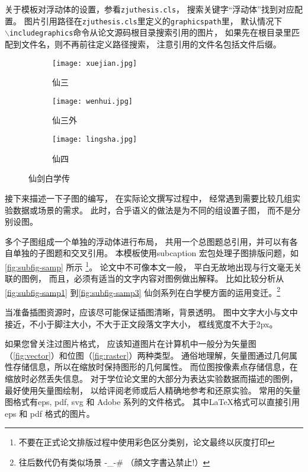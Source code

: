 关于模板对浮动体的设置，参看\texttt{zjuthesis.cls}，
搜索关键字“浮动体”找到对应配置。
图片引用路径在\texttt{zjuthesis.cls}里定义的\texttt{graphicspath}里，
默认情况下\\\texttt{$\backslash$includegraphics}命令从论文源码根目录搜索引用的图片，
如果先在根目录里匹配到文件名，则不再前往定义路径搜索，
注意引用的文件名包括文件后缀。

\begin{figure}[htbp]
	\centering
	\begin{subfigure}[b]{.45\textwidth}  %
		\centering
		\texttt{[image: xuejian.jpg]}
		\caption{仙三}\label{fig:subfig-samp1}
	\end{subfigure}
	\begin{subfigure}[b]{.45\textwidth}
		\centering
		\texttt{[image: wenhui.jpg]}
		\caption{仙三外}\label{fig:subfig-samp2}
	\end{subfigure}
	\begin{subfigure}[b]{.45\textwidth}
		\centering
		\texttt{[image: lingsha.jpg]}
		\caption{仙四}\label{fig:subfig-samp3}
	\end{subfigure}
	\caption{仙剑白学传}\label{fig:subfig-samp}
\end{figure}

接下来描述一下子图的编写，
在实际论文撰写过程中，
经常遇到需要比较几组实验数据或场景的需求。
此时，合乎语义的做法是为不同的组设置子图，
而不是分别设图。

多个子图组成一个单独的浮动体进行布局，
共用一个总图题总引用，并可以有各自单独的子图题和交叉引用。
本模板使用subcaption 宏包处理子图排版问题，如\autoref{fig:subfig-samp} 所示
\footnote{不要在正式论文排版过程中使用彩色区分类别，论文最终以灰度打印}。
论文中不可像本文一般，
平白无故地出现与行文毫无关联的图例，
而且，必须有适当的文字内容对图例做出解释。
比如比较分析从\autoref{fig:subfig-samp1} 到\autoref{fig:subfig-samp3}
仙剑系列在白学梗方面的运用变迁。\footnote{往后数代仍有类似场景 -\_-\# （顔文字書込禁止!）}

当准备插图资源时，应该尽可能保证插图清晰，背景透明。
图中文字大小与文中接近，不小于脚注大小，不大于正文段落文字大小，
框线宽度不大于2px。

如果您曾关注过图片格式，
应该知道图片在计算机中一般分为矢量图（\autoref{fig:vector}）和位图（\autoref{fig:raster}）两种类型。
通俗地理解，矢量图通过几何属性存储信息，所以在缩放时保持图形的几何属性。
而位图按像素点存储信息，在缩放时必然丢失信息。
对于学位论文里的大部分为表达实验数据而描述的图例，最好使用矢量图绘制，
以给评阅老师或后人精确地参考和还原实验。
常用的矢量图格式有eps, pdf, svg 和 Adobe 系列的文件格式。
其中\LaTeX 格式可以直接引用eps 和 pdf 格式的图片。

